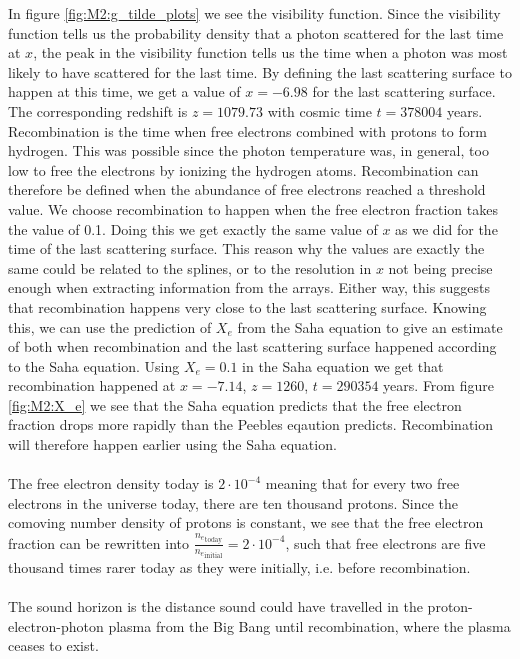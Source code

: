 \documentclass{aa}
\begin{document}
\noindent
In figure \ref{fig:M2:g_tilde_plots} we see the visibility function.
Since the visibility function tells us the probability density that a photon scattered for the last time at $x$, the peak in the visibility function tells us the time 
when a photon was most likely to have scattered for the last time. By defining the last scattering surface to happen at this time, we get a value of $x=-6.98$ for the last scattering surface. The corresponding 
redshift is $z = 1079.73$ with cosmic time $t=378004$ years. Recombination is the time when free electrons combined with protons to form hydrogen. This was possible
since the photon temperature was, in general, too low to free the electrons by ionizing the hydrogen atoms. Recombination can therefore be defined when the abundance of 
free electrons reached a threshold value. We choose recombination to happen when the free electron fraction takes the value of 0.1. Doing this we get exactly the same
value of $x$ as we did for the time of the last scattering surface. This reason why the values are exactly the same could be related to the splines, or to the
resolution in $x$ not being precise enough when extracting information from the arrays. Either way, this suggests that recombination happens very close to the last scattering
surface. Knowing this, we can use the prediction of $X_e$ from the Saha equation to give an estimate of both when recombination and the last scattering surface happened according to the Saha equation.
Using $X_e=0.1$ in the Saha equation we get that recombination happened at $x= -7.14$, $z = 1260$, $t=290354$ years.
From figure \ref{fig:M2:X_e} we see that the Saha equation predicts that the free electron fraction drops more rapidly than the Peebles eqaution predicts. Recombination will therefore happen earlier
using the Saha equation.\\
\\
The free electron density today is $2\cdot 10^{-4}$ meaning that for every two free electrons in the universe today, there are ten thousand protons. Since the comoving 
number density of protons is constant, we see that the free electron fraction can be rewritten into $\frac{{n_e}_\mathrm{today}}{{n_e}_\mathrm{initial}} = 2\cdot 10^{-4}$, such that free electrons 
are five thousand times rarer today as they were initially, i.e. before recombination.\\
\\
The sound horizon is the distance sound could have travelled in the proton-electron-photon plasma from the Big Bang until recombination, where the plasma ceases to exist.
\end{document}
